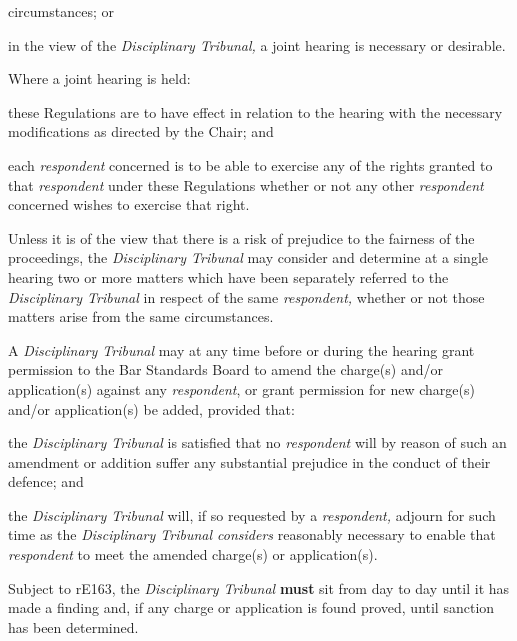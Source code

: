 circumstances; or\item in the view of the \emph{Disciplinary Tribunal, }a joint hearing is
necessary or desirable.\ln
{}\par
Where a joint hearing is held:\\\nl \item these Regulations are to have effect in relation to the hearing with
the necessary modifications as directed by the Chair; and\item each \emph{respondent }concerned is to be able to exercise any of the
rights granted to that \emph{respondent }under these Regulations whether
or not any other \emph{respondent }concerned wishes to exercise that
right.\ln
{}\par
Unless it is of the view that there is a risk of prejudice to the
fairness of the proceedings, the \emph{Disciplinary Tribunal }may
consider and determine at a single hearing two or more matters which
have been separately referred to the \emph{Disciplinary Tribunal }in
respect of the same \emph{respondent, }whether or not those matters
arise from the same circumstances.\\
\par
{}
A \emph{Disciplinary Tribunal} may at any time before or during the
hearing grant permission to the Bar Standards Board to amend the
charge(s) and/or application(s) against any \emph{respondent}, or grant
permission for new charge(s) and/or application(s) be added, provided
that:\\\nl \item the \emph{Disciplinary Tribunal }is satisfied that
no \emph{respondent }will by reason of such an amendment or addition
suffer any substantial prejudice in the conduct of their defence; and\item the \emph{Disciplinary Tribunal }will, if so requested by
a \emph{respondent, }adjourn for such time as the \emph{Disciplinary
Tribunal considers }reasonably necessary to enable
that \emph{respondent }to meet the amended charge(s) or
application(s).\ln
{}\par
{}
Subject to rE163, the \emph{Disciplinary Tribunal}  \textcolor{myred}{\textbf{must}} sit from day to
day until it has made a finding and, if any charge or application is
found proved, until sanction has been determined.\\
